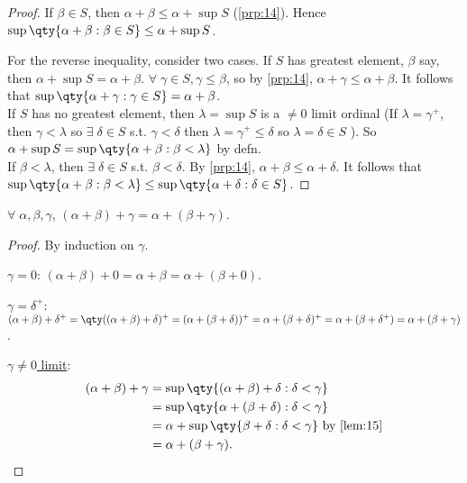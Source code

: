 \begin{proof}
    If $\beta \in S$, then $\alpha + \beta \leq \alpha + \sup S$ (\cref{prp:14}).
    Hence $\sup \qty{\alpha + \beta : \beta \in S} \leq \alpha + \sup S$.

    For the reverse inequality, consider two cases.
    If $S$ has greatest element, $\beta$ say, then $\alpha + \sup S = \alpha + \beta$.
    $\forall \; \gamma \in S, \gamma \leq \beta$, so by \cref{prp:14}, $\alpha + \gamma \leq \alpha + \beta$.
    It follows that $\sup\qty{\alpha + \gamma : \gamma \in S} = \alpha + \beta$. \\
    If $S$ has no greatest element, then $\lambda = \sup S$ is a $\neq 0$ limit ordinal (If $\lambda = \gamma^+$, then $\gamma < \lambda$ so $\exists \; \delta \in S$ s.t. $\gamma < \delta$ then $\lambda = \gamma^+ \leq \delta$ so $\lambda = \delta \in S$ \Lightning).
    So $\alpha + \sup S = \sup \qty{\alpha + \beta : \beta < \lambda}$ by defn. \\
    If $\beta < \lambda$, then $\exists \; \delta \in S$ s.t. $\beta < \delta$.
    By \cref{prp:14}, $\alpha + \beta \leq \alpha + \delta$.
    It follows that $\sup \qty{\alpha + \beta : \beta < \lambda} \leq \sup \qty{\alpha + \delta : \delta \in S}$.
\end{proof}

\begin{proposition} \label{prp:16}
    $\forall \; \alpha, \beta, \gamma$, $(\alpha + \beta) + \gamma = \alpha + (\beta + \gamma)$.
\end{proposition}

\begin{proof}
    By induction on $\gamma$.

    \underline{$\gamma = 0$}: $(\alpha + \beta) + 0 = \alpha + \beta = \alpha + (\beta + 0)$.

    \underline{$\gamma = \delta^+$}: $(\alpha + \beta) + \delta^+ = \qty((\alpha + \beta) + \delta)^+ = (\alpha + (\beta + \delta))^+ = \alpha + (\beta + \delta)^+ = \alpha + (\beta + \delta^+) = \alpha + (\beta + \gamma)$.

    \underline{$\gamma \neq 0$ limit}:
    \begin{align*}
        (\alpha + \beta) + \gamma &= \sup \qty{(\alpha + \beta) + \delta : \delta < \gamma} \\
        &= \sup \qty{\alpha + (\beta + \delta) : \delta < \gamma} \\
        &= \alpha + \sup\qty{\beta + \delta : \delta < \gamma} \text{ by \cref{lem:15}} \\
        &= \alpha + (\beta + \gamma).
    \end{align*}
\end{proof}

